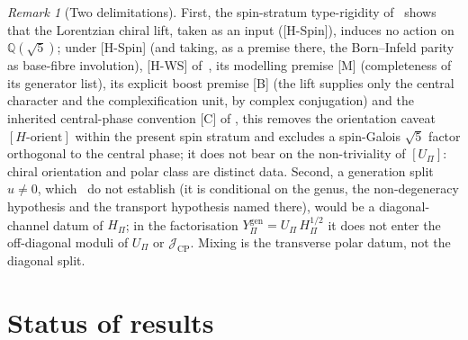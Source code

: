 \documentclass[11pt]{article}
\theoremstyle{definition}
\theoremstyle{remark}
\newtheorem{remark}{Remark}
\newcommand{\Ygen}{{Y^{\mathrm{gen}}_{\Pi}}}
\newcommand{\JCP}{\mathcal{J}_{\mathrm{CP}}}
\newcommand{\Hpi}{H_{\Pi}}
\newcommand{\Upi}{U_{\Pi}}
\begin{document}
    \begin{remark}[Two delimitations]
      \label{rem:precautions}
      First, the spin-stratum type-rigidity of~\cite{Beau2026aog} shows that the Lorentzian chiral lift, taken as an input
      ([H-Spin]), induces no action on $\mathbb{Q}(\sqrt{5})$; under [H-Spin] (and taking, as a premise there, the Born--Infeld parity as base-fibre involution), [H-WS] of~\cite{Beau2026q11of}, its
      modelling premise [M] (completeness of its generator list), its explicit boost premise [B] (the lift supplies only
      the central character and the complexification unit, by complex conjugation) and the inherited central-phase convention [C] of
      \cite{Beau2026cho}, this removes the orientation caveat $[H\text{-orient}]$ within the present spin stratum
      and excludes a spin-Galois $\sqrt{5}$ factor orthogonal to the central phase; it does not bear on the non-triviality of $[\Upi]$: chiral orientation and polar class are
      distinct data.
      Second, a generation split $u \neq 0$, which~\cite{Beau2026prs, Beau2026bim} do not establish (it is conditional
      on the genus, the non-degeneracy hypothesis and the transport hypothesis named there), would be a
      diagonal-channel datum of $\Hpi$;
      in the factorisation $\Ygen = \Upi\,\Hpi^{1/2}$ it does not enter the off-diagonal moduli of $\Upi$ or $\JCP$.
      Mixing is the transverse polar datum, not the diagonal split.
    \end{remark}

  \section{Status of results}
    \label{sec:status}
\end{document}
